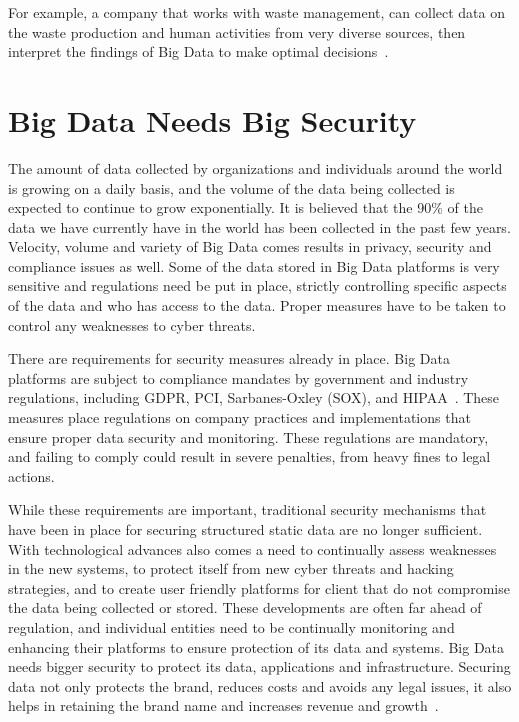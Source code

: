 For example, a company that works with waste management,
can collect data on  the waste production and human activities
from very diverse sources, then interpret the findings of
Big Data  to make optimal decisions~\cite{yenkar2014review}.

\section{Big Data Needs Big Security}
The amount of data collected by organizations and individuals 
around the world is growing on a daily basis, and the volume of
the data being collected is expected to continue to grow 
exponentially.  It is believed that the 90\% of the data we
have currently have in the world has been collected in the past
few years. Velocity, volume and variety of Big Data comes results
in privacy, security and compliance issues as well. Some of the
data stored in Big Data platforms is very sensitive and  regulations
need be put in place, strictly controlling specific aspects of the
data and  who has access to the data. Proper measures have to be
taken to control any weaknesses to cyber threats. 

There are requirements for security measures already in place. 
Big Data platforms are subject to compliance mandates by government
and industry regulations, including GDPR, PCI, Sarbanes-Oxley (SOX),
and HIPAA~\cite{imperva}. These measures place regulations on
company practices and implementations that ensure proper data
security and monitoring. These regulations are mandatory, and failing
to comply could result in severe penalties, from heavy fines to
legal actions.

While these requirements are important, traditional security
mechanisms that have been in place for securing structured 
static data are no longer sufficient. With technological 
advances also comes a need to continually assess weaknesses
in the new systems, to protect itself from new cyber threats
and hacking strategies, and to create user friendly platforms 
for client that do not compromise the data being collected
or stored. These developments are often far ahead of regulation, 
and individual entities need to be continually monitoring and
enhancing their platforms to ensure protection of its data 
and systems.  Big Data needs bigger security to protect its 
data, applications and infrastructure. Securing data not only 
protects the brand, reduces costs and avoids any legal issues, 
it also helps in retaining the brand name and increases 
revenue and growth~\cite{csasecurity}.

